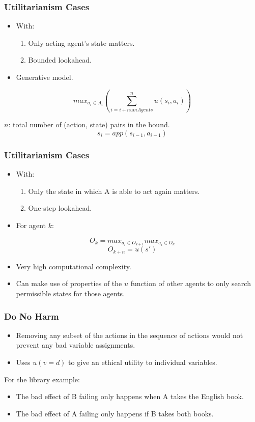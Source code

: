 \documentclass{beamer}
\begin{document}
 \begin{frame}
\frametitle{Utilitarianism Cases}
\begin{itemize}
\item With:
\begin{enumerate}
\item Only acting agent's state matters.
\item Bounded lookahead.
\end{enumerate}
\item Generative model.
\end{itemize}

\[
max_{a_i \in A_i} \left( \sum^n_{i=i+numAgents} u(s_i,a_i) \right)
\]

$n$: total number of (action, state) pairs in the bound.
\[
s_i=app(s_{i-1},a_{i-1})
\]
 \end{frame} 
 
 
 \begin{frame}
\frametitle{Utilitarianism Cases}
\begin{itemize}
\item With:
\begin{enumerate}
\item Only the state in which A is able to act again matters.
\item One-step lookahead.
\end{enumerate}
\item For agent $k$:
\end{itemize}
\[
O_k = max_{{a_i \in O_{k+1}}} max_{a_i \in O_k}   
\]
\[
O_{k+n} = u(s')
\]

\begin{itemize}
\item Very high computational complexity.
\item Can make use of properties of the $u$ function of other agents to only search permissible states for those agents.
\end{itemize}

 \end{frame} 
 
 \begin{frame}
\frametitle{Do No Harm}
\begin{itemize}
\item Removing any subset of the actions in the sequence of actions would not prevent any bad variable assignments.
\item Uses $u(v=d)$ to give an ethical utility to individual variables.
\end{itemize}

For the library example:
\begin{itemize}
\item The bad effect of B failing only happens when A takes the English book.
\item The bad effect of A failing only happens if B takes both books.
\end{itemize}
 \end{frame} 
 
\end{document}
